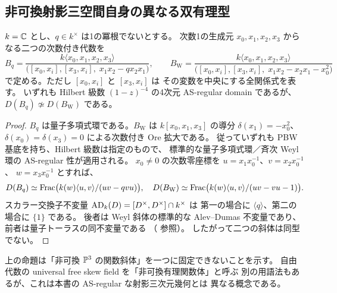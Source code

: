 \subsection{非可換射影三空間自身の異なる双有理型}
\begin{proposition}\label{prop:distinct-nc-p3}
$k=\mathbb C$ とし、$q\in k^\times$ は1の冪根でないとする。
次数1の生成元 $x_0,x_1,x_2,x_3$ からなる二つの次数付き代数を
\[
 B_q=\frac{k\langle x_0,x_1,x_2,x_3\rangle}
 {\bigl([x_0,x_i],[x_3,x_i],\;x_1x_2-qx_2x_1\bigr)},
 \qquad
 B_{\mathrm W}=\frac{k\langle x_0,x_1,x_2,x_3\rangle}
 {\bigl([x_0,x_i],[x_3,x_i],\;x_1x_2-x_2x_1-x_0^2\bigr)}
\]
で定める。ただし $[x_0,x_i]$ と $[x_3,x_i]$ は
その変数を中央にする全関係式を表す。
いずれも Hilbert 級数 $(1-z)^{-4}$ の4次元 AS-regular domain であるが、
$D(B_q)\not\simeq D(B_{\mathrm W})$ である。
\end{proposition}
\begin{proof}
$B_q$ は量子多項式環である。$B_{\mathrm W}$ は
$k[x_0,x_1,x_3]$ の導分 $\delta(x_1)=-x_0^2$、
$\delta(x_0)=\delta(x_3)=0$ による次数付き Ore 拡大である。
従っていずれも PBW 基底を持ち、Hilbert 級数は指定のもので、
標準的な量子多項式環／斉次 Weyl 環の AS-regular 性が適用される。
$x_0\ne0$ の次数零座標を $u=x_1x_0^{-1}$、$v=x_2x_0^{-1}$、
$w=x_3x_0^{-1}$ とすれば、
\[
 D(B_q)\simeq\operatorname{Frac}\bigl(k(w)\langle u,v\rangle/(uv-qvu)\bigr),
 \quad
 D(B_{\mathrm W})\simeq\operatorname{Frac}\bigl(k(w)\langle u,v\rangle/(uv-vu-1)\bigr).
\]
スカラー交換子不変量 $\operatorname{AD}_k(D)=[D^\times,D^\times]\cap k^\times$ は
第一の場合に $\langle q\rangle$、第二の場合に $\{1\}$ である。
後者は Weyl 斜体の標準的な Alev--Dumas 不変量であり、
前者は量子トーラスの同不変量である
（\cite{GoodearlYakimov,StaffordVanDenBergh2001} 参照）。
したがって二つの斜体は同型でない。
\end{proof}

\begin{remark}
上の命題は「非可換 $\mathbb P^3$ の関数斜体」を一つに固定できないことを示す。
自由代数の universal free skew field を「非可換有理関数体」と呼ぶ
別の用語法もあるが、これは本書の AS-regular な射影三次元幾何とは
異なる概念である。
\end{remark}

